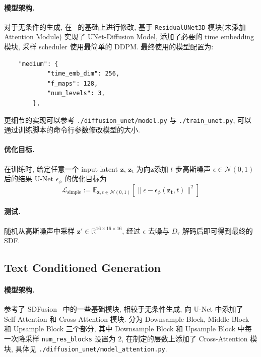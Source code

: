 \documentclass[11pt]{article}
\newcommand\1{\mathds{1}}
\newcommand\R{\mathbb{R}}
\newcommand\E{\mathbb{E}}
\begin{document}
\paragraph{模型架构.} 对于无条件的生成, 在~\cite{unet-3d} 的基础上进行修改, 基于 \texttt{ResidualUNet3D} 模块(未添加 Attention Module) 实现了 UNet-Diffusion Model, 添加了必要的 time embedding 模块, 采样 scheduler 使用最简单的 DDPM.
最终使用的模型配置为:
\begin{verbatim}
    "medium": {
            "time_emb_dim": 256,
            "f_maps": 128,
            "num_levels": 3,
        },
\end{verbatim}
更细节的实现可以参考 \texttt{./diffusion\_unet/model.py} 与 \texttt{./train\_unet.py}, 可以通过训练脚本的命令行参数修改模型的大小. 

\paragraph{优化目标.} 在训练时, 给定任意一个 input latent $\mathbf{z}$, $\mathbf{z}_t$ 为向$\mathbf{z}$添加 $t$ 步高斯噪声 $\epsilon \in \mathcal{N}(0,1)$ 后的结果
U-Net $\epsilon_\phi$ 的优化目标为
\begin{equation}
    \mathcal{L}_{\text{simple}} := \E_{\mathbf{z}, \epsilon \in \mathcal{N}(0,1)} \left[\|\epsilon - \epsilon_{\phi}(\mathbf{z_t}, t)\|^2\right]
\end{equation}
\paragraph{测试.} 随机从高斯噪声中采样 $\mathbf{z'} \in \R^{16\times 16\times 16}$, 经过 $\epsilon$ 去噪与 $D_\tau$ 解码后即可得到最终的 SDF.

\subsection{Text Conditioned Generation}
\paragraph{模型架构.} 参考了 SDFusion~\cite{cheng2023sdfusion} 中的一些基础模块, 相较于无条件生成, 向 U-Net 中添加了 Self-Attention 和 Cross-Attention 模块.
分为 Downsample Block, Middle Block 和 Upsample Block 三个部分, 其中 Downsample Block 和 Upsample Block 中每一次降采样 \texttt{num\_res\_blocks} 设置为 2, 在制定的层数上添加了 Cross-Attention 模块, 具体见 \texttt{./diffusion\_unet/model\_attention.py}.
\end{document}
